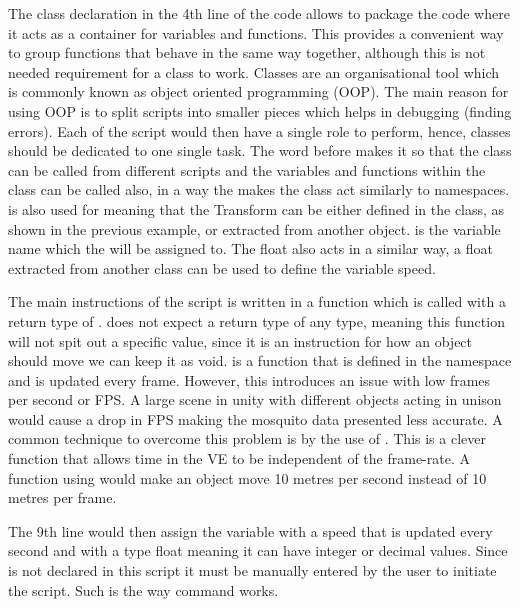 The class declaration in the 4th line of the code allows to package the code where it acts as a container for variables and functions. This provides a convenient way to group functions that behave in the same way together, although this is not needed requirement for a class to work. Classes are an organisational tool which is commonly known as object oriented programming (OOP). The main reason for using OOP is to split scripts into smaller pieces which helps in debugging (finding errors). Each of the script would then have a single role to perform, hence, classes should be dedicated to one single task. The word  before  makes it so that the class can be called from different scripts and the variables and functions within the class can be called also, in a way the  makes the class act similarly to namespaces.  is also used for  meaning that the Transform can be either defined in the class, as shown in the previous example, or extracted from another object.  is the variable name which the  will be assigned to. The float  also acts in a similar way, a float extracted from another class can be used to define the variable speed.

The main instructions of the script is written in a function which is called  with a return type of .  does not expect a return type of any type, meaning this function will not spit out a specific value, since it is an instruction for how an object should move we can keep it as void.  is a function that is defined in the namespace  and is updated every frame. However, this introduces an issue with low frames per second or FPS. A large scene in unity with different objects acting in unison would cause a drop in FPS making the mosquito data presented less accurate. A common technique to overcome this problem is by the use of . This is a clever function that allows time in the VE to be independent of the frame-rate. A function using  would make an object move 10 metres per second instead of 10 metres per frame.

The 9th line would then assign the variable  with a speed that is updated every second and with a type float meaning it can have integer or decimal values. Since  is not declared in this script it must be manually entered by the user to initiate the script. Such is the way  command works.

